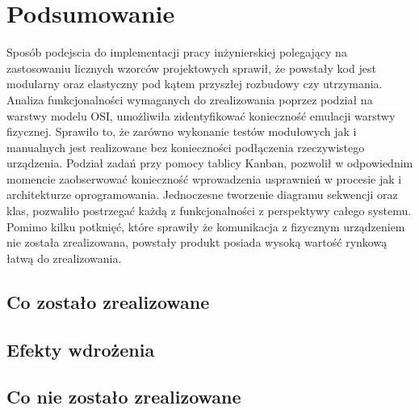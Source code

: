 \chapter{Podsumowanie}
    Sposób podejscia do implementacji pracy inżynierskiej polegający na zastosowaniu licznych wzorców projektowych sprawił, że powstały kod
    jest modularny oraz elastyczny pod kątem przyszłej rozbudowy czy utrzymania. 
    Analiza funkcjonalności wymaganych do zrealizowania poprzez podział na warstwy modelu OSI, umożliwiła zidentyfikować konieczność emulacji warstwy fizycznej. 
    Sprawiło to, że zarówno wykonanie testów modułowych jak i manualnych jest realizowane bez konieczności podłączenia rzeczywistego urządzenia. 
    Podział zadań przy pomocy tablicy Kanban, pozwolił w odpowiednim momencie zaobserwować konieczność wprowadzenia usprawnień 
    w procesie jak i architekturze oprogramowania. Jednoczesne tworzenie diagramu sekwencji oraz klas, pozwaliło postrzegać każdą z funkcjonalności z perspektywy całego systemu.
    Pomimo kilku potknięć, które sprawiły że komunikacja z fizycznym urządzeniem nie została zrealizowana, powstały produkt posiada wysoką wartość rynkową 
    łatwą do zrealizowania.
    \section{Co zostało zrealizowane}
    \section{Efekty wdrożenia}
    \section{Co nie zostało zrealizowane}
